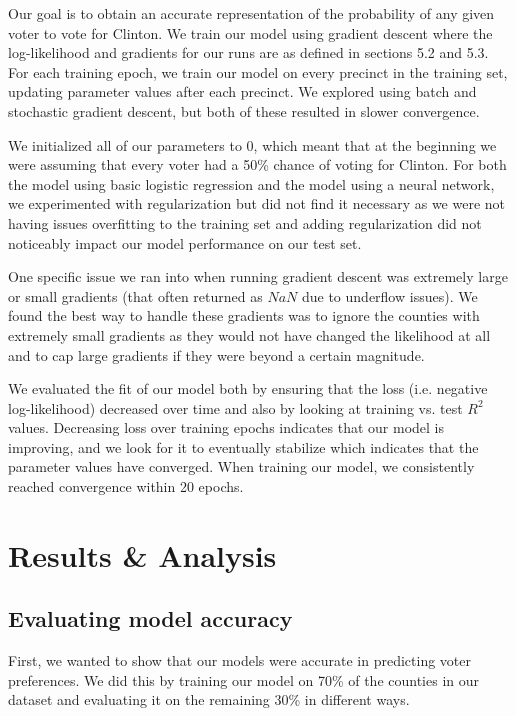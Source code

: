 \documentclass[10pt,twocolumn,letterpaper]{article}
\begin{document}
Our goal is to obtain an accurate representation of the probability of any given voter to vote for Clinton. We train our model using gradient descent where the log-likelihood and gradients for our runs are as defined in sections 5.2 and 5.3. For each training epoch, we train our model on every precinct in the training set, updating parameter values after each precinct. We explored using batch and stochastic gradient descent, but both of these resulted in slower convergence.

We initialized all of our parameters to 0, which meant that at the beginning we were assuming that every voter had a 50\% chance of voting for Clinton. For both the model using basic logistic regression and the model using a neural network, we experimented with regularization but did not find it necessary as we were not having issues overfitting to the training set and adding regularization did not noticeably impact our model performance on our test set. 

One specific issue we ran into when running gradient descent was extremely large or small gradients (that often returned as $NaN$ due to underflow issues). We found the best way to handle these gradients was to ignore the counties with extremely small gradients as they would not have changed the likelihood at all and to cap large gradients if they were beyond a certain magnitude.

We evaluated the fit of our model both by ensuring that the loss (i.e. negative log-likelihood) decreased over time and also by looking at training vs. test $R^2$ values. Decreasing loss over training epochs indicates that our model is improving, and we look for it to eventually stabilize which indicates that the parameter values have converged. When training our model, we consistently reached convergence within 20 epochs.

\section{Results \& Analysis}

\subsection{Evaluating model accuracy}
First, we wanted to show that our models were accurate in predicting voter preferences. We did this by training our model on 70\% of the counties in our dataset and evaluating it on the remaining 30\% in different ways.
\end{document}
